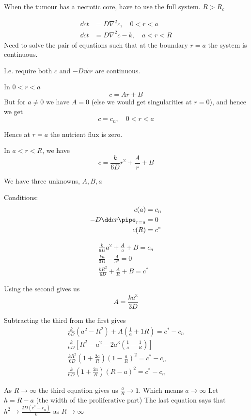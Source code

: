 \documentclass{X:/Documents/Coding/Latex/myassignment}
\begin{document}
When the tumour has a necrotic core, have to use the full system.
$R > R_c$

\begin{align*}
	\dd ct &= D\nabla^2 c , \quad 0<r<a\\
	\dd ct &= D\nabla^2 c - k, \quad a<r<R
\end{align*}
Need to solve the pair of equations such that at the boundary $r=a$ the system is continuous.

I.e. require both $c$ and $-D \dd cr$ are continuous.

In $0<r<a$
\[c = Ar + B\]
But for $a\neq 0$ we have $A=0$ (else we would get singularities at $r=0$), and hence we get
\[c = c_n, \quad 0 < r < a\]

Hence at $r=a $ the nutrient flux is zero.

In $a<r<R$, we have
\[c = \frac{k}{6D}r^2 + \frac{A}{r} + B\]

We have three unknowns, $A,B,a$

Conditions:
\begin{align*}
	c(a) &= c_n\\
	-D \dd cr\pipe_{r=a} &= 0\\
	c(R) &= c^*\\
\end{align*}

\begin{align*}
	\frac{k}{6D}a^2 + \frac{A}{a} + B = c_n\\
	\frac{ka}{3D} - \frac{A}{a^2} = 0\\
	\frac{k R^2}{6D} + \frac{A}{R} + B = c^*
\end{align*}

Using the second gives us
\[A = \frac{ka^3}{3D}\]

Subtracting the third from the first gives
\begin{align*}
	\frac{k}{6D} \left(a^2 - R^2\right) + A\left(\frac1a + 1R\right) = c^* - c_n\\
	\frac{k}{6D} \left[R^2 - a^2 - 2a^3 \left(\frac1a - \frac1R\right)\right]\\
	\frac{kR^2}{6D} \left(1 + \frac{2a}{R}\right)\left(1 - \frac aR\right)^2 = c^* - c_n\\
	\frac{k}{6D} \left(1 + \frac{2a}{R}\right)\left(R-a\right)^2 = c^* - c_n
\end{align*}

As $R\to \infty$ the third equation gives us $\frac aR \to 1$. Which means $a \to \infty$
Let $h=R - a$ (the width of the proliferative part)
The last equation says that $h^2 \to \frac{2D(c^* - c_n)}{k}$ as $R \to \infty$ 
\end{document}
